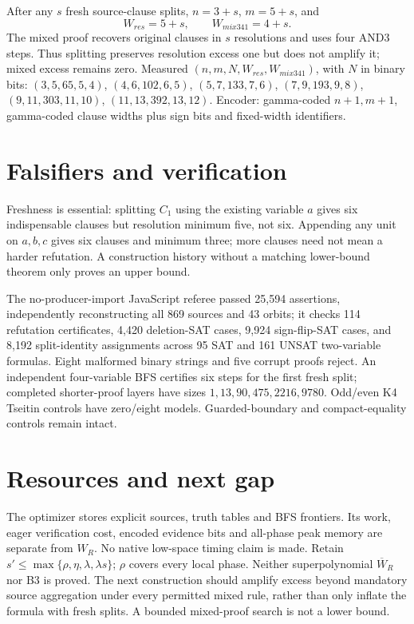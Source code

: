 \documentclass[11pt]{article}
\begin{document}
After any $s$ fresh source-clause splits, $n=3+s$, $m=5+s$, and
\[
W_{res}=5+s,\qquad W_{mix341}=4+s.
\]
The mixed proof recovers original clauses in $s$ resolutions and uses four AND3 steps. Thus splitting preserves resolution excess one but does not amplify it; mixed excess remains zero. Measured $(n,m,N,W_{res},W_{mix341})$, with $N$ in binary bits: $(3,5,65,5,4)$, $(4,6,102,6,5)$, $(5,7,133,7,6)$, $(7,9,193,9,8)$, $(9,11,303,11,10)$, $(11,13,392,13,12)$. Encoder: gamma-coded $n+1,m+1$, gamma-coded clause widths plus sign bits and fixed-width identifiers.

\section{Falsifiers and verification}
Freshness is essential: splitting $C_1$ using the existing variable $a$ gives six indispensable clauses but resolution minimum five, not six. Appending any unit on $a,b,c$ gives six clauses and minimum three; more clauses need not mean a harder refutation. A construction history without a matching lower-bound theorem only proves an upper bound.

The no-producer-import JavaScript referee passed 25,594 assertions, independently reconstructing all 869 sources and 43 orbits; it checks 114 refutation certificates, 4,420 deletion-SAT cases, 9,924 sign-flip-SAT cases, and 8,192 split-identity assignments across 95 SAT and 161 UNSAT two-variable formulas. Eight malformed binary strings and five corrupt proofs reject. An independent four-variable BFS certifies six steps for the first fresh split; completed shorter-proof layers have sizes $1,13,90,475,2216,9780$. Odd/even K4 Tseitin controls have zero/eight models. Guarded-boundary and compact-equality controls remain intact.

\section{Resources and next gap}
The optimizer stores explicit sources, truth tables and BFS frontiers. Its work, eager verification cost, encoded evidence bits and all-phase peak memory are separate from $W_R$. No native low-space timing claim is made. Retain $s'\le\max\{\rho,\eta,\lambda,\lambda s\}$; $\rho$ covers every local phase. Neither superpolynomial $\overline W_R$ nor B3 is proved. The next construction should amplify excess beyond mandatory source aggregation under every permitted mixed rule, rather than only inflate the formula with fresh splits. A bounded mixed-proof search is not a lower bound.
\end{document}
